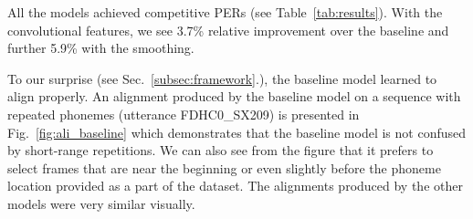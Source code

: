 \documentclass{article} %
\begin{document}
All the models achieved competitive
PERs (see Table~\ref{tab:results}). 
With the convolutional features, we see 3.7\% relative improvement over the
baseline and further 5.9\% with the smoothing. 




To our surprise
(see Sec.~\ref{subsec:framework}.),  
the baseline model learned to align properly.
An alignment produced by the baseline model
on a sequence with repeated phonemes (utterance FDHC0\_SX209) is presented in
Fig.~\ref{fig:ali_baseline} which demonstrates that  the baseline model is not
confused by short-range repetitions. We can also see
from the figure that it
prefers to select frames that are near the beginning or even slightly before the
phoneme location provided as a part of the dataset. The alignments produced by
the other models were very similar visually.
\end{document}
